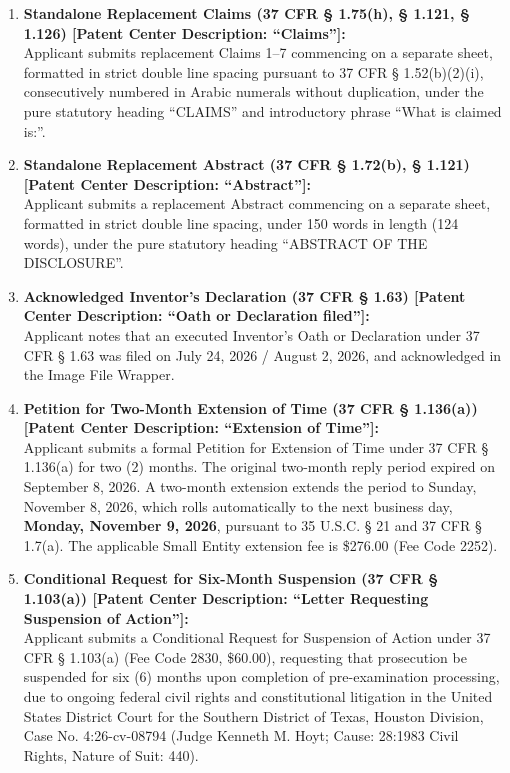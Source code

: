 \documentclass[11pt,letterpaper]{article}
\begin{document}
\begin{enumerate}[leftmargin=*]
    \item \textbf{Standalone Replacement Claims (37 CFR \S{} 1.75(h), \S{} 1.121, \S{} 1.126) [Patent Center Description: ``Claims'']:} \\
    Applicant submits replacement Claims 1--7 commencing on a separate sheet, formatted in strict double line spacing pursuant to 37 CFR \S{} 1.52(b)(2)(i), consecutively numbered in Arabic numerals without duplication, under the pure statutory heading ``CLAIMS'' and introductory phrase ``What is claimed is:''.

    \item \textbf{Standalone Replacement Abstract (37 CFR \S{} 1.72(b), \S{} 1.121) [Patent Center Description: ``Abstract'']:} \\
    Applicant submits a replacement Abstract commencing on a separate sheet, formatted in strict double line spacing, under 150 words in length (124 words), under the pure statutory heading ``ABSTRACT OF THE DISCLOSURE''.

    \item \textbf{Acknowledged Inventor's Declaration (37 CFR \S{} 1.63) [Patent Center Description: ``Oath or Declaration filed'']:} \\
    Applicant notes that an executed Inventor's Oath or Declaration under 37 CFR \S{} 1.63 was filed on July 24, 2026 / August 2, 2026, and acknowledged in the Image File Wrapper.

    \item \textbf{Petition for Two-Month Extension of Time (37 CFR \S{} 1.136(a)) [Patent Center Description: ``Extension of Time'']:} \\
    Applicant submits a formal Petition for Extension of Time under 37 CFR \S{} 1.136(a) for two (2) months. The original two-month reply period expired on September 8, 2026. A two-month extension extends the period to Sunday, November 8, 2026, which rolls automatically to the next business day, \textbf{Monday, November 9, 2026}, pursuant to 35 U.S.C. \S{} 21 and 37 CFR \S{} 1.7(a). The applicable Small Entity extension fee is \$276.00 (Fee Code 2252).

    \item \textbf{Conditional Request for Six-Month Suspension (37 CFR \S{} 1.103(a)) [Patent Center Description: ``Letter Requesting Suspension of Action'']:} \\
    Applicant submits a Conditional Request for Suspension of Action under 37 CFR \S{} 1.103(a) (Fee Code 2830, \$60.00), requesting that prosecution be suspended for six (6) months upon completion of pre-examination processing, due to ongoing federal civil rights and constitutional litigation in the United States District Court for the Southern District of Texas, Houston Division, Case No. 4:26-cv-08794 (Judge Kenneth M. Hoyt; Cause: 28:1983 Civil Rights, Nature of Suit: 440).
\end{enumerate}
\end{document}
